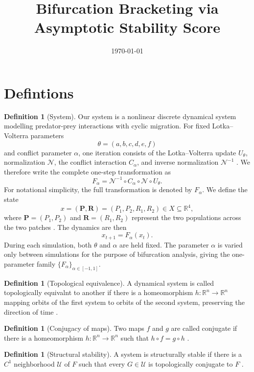 \documentclass[11pt]{article}
\title{Bifurcation Bracketing via Asymptotic Stability Score}
\author{}
\date{\today}
\theoremstyle{plain}
\theoremstyle{definition}
\newtheorem{definition}[theorem]{Definition}
\theoremstyle{remark}
\begin{document}
\maketitle


\section{Defintions}

\begin{definition}[System]
Our system is a nonlinear discrete dynamical system modelling predator-prey interactions with cyclic migration. For fixed Lotka–Volterra parameters
\[
\theta=(a,b,c,d,e,f)
\]and conflict parameter \(\alpha\), one iteration consists of the Lotka–Volterra update \(U_\theta\), normalization \(\mathcal N\), the conflict interaction \(C_\alpha\),
and inverse normalization \(\mathcal N^{-1}\) \citep{Albeverio01042008}. We therefore write the complete one-step transformation as
\[
F_\alpha
=
\mathcal N^{-1}\circ C_\alpha\circ\mathcal N\circ U_\theta.
\]For notational simplicity, the full transformation is denoted by \(F_\alpha\).
We define the state
\[
x=(\mathbf P,\mathbf R)
=(P_1,P_2,R_1,R_2)\in X\subseteq\mathbb R^4,
\]where \(\mathbf P=(P_1,P_2)\) and \(\mathbf R=(R_1,R_2)\) represent the two populations across the two patches \citep{Albeverio01042008}. The dynamics are then
\[
x_{t+1}=F_\alpha(x_t).
\]
During each simulation, both \(\theta\) and \(\alpha\) are held fixed. The parameter \(\alpha\) is varied only between simulations for the
purpose of bifurcation analysis,
giving the one-parameter family \(\{F_\alpha\}_{\alpha\in[-1,1]}\).
\end{definition}

\begin{definition}[Topological equivalence]
A dynamical system is called topologically equivalnt to another if there is a homeomorphism
\(h:\mathbb R^n\to\mathbb R^n\) mapping orbits of the first system to orbits of the second system,
preserving the direction of time \citep{Kuznetsov2023}.
\end{definition}

\begin{definition}[Conjugacy of maps]
Two maps \(f\) and \(g\) are called conjugate if there is a homeomorphism \(h:\mathbb R^n\to\mathbb R^n\) such that
\(h\circ f = g\circ h\) \citep{Kuznetsov2023}.
\end{definition}

\begin{definition}[Structural stability]
A system is structurally stable if there is a \(C^1\) neighborhood
\(\mathcal U\) of \(F\) such that every \(G \in \mathcal U\) is topologically conjugate to \(F\) \citep{Kuznetsov2023}.
\end{definition}
\end{document}
